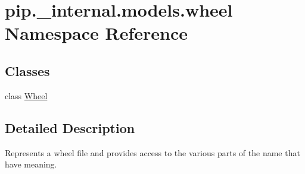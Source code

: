 \hypertarget{namespacepip_1_1__internal_1_1models_1_1wheel}{}\section{pip.\+\_\+internal.\+models.\+wheel Namespace Reference}
\label{namespacepip_1_1__internal_1_1models_1_1wheel}
\subsection*{Classes}
\begin{DoxyCompactItemize}
\item 
class \hyperlink{classpip_1_1__internal_1_1models_1_1wheel_1_1Wheel}{Wheel}
\end{DoxyCompactItemize}


\subsection{Detailed Description}
\begin{DoxyVerb}Represents a wheel file and provides access to the various parts of the
name that have meaning.
\end{DoxyVerb}
 